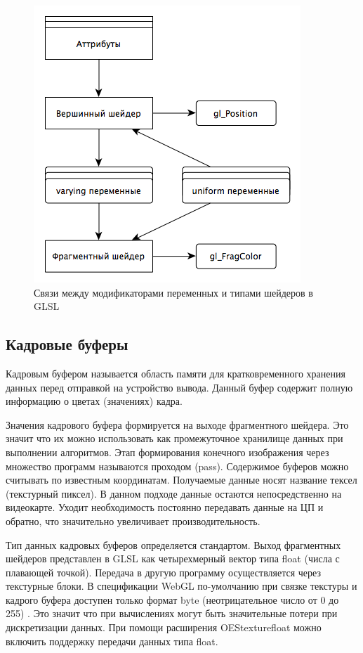 \begin{figure}
\begin{center}
  \includegraphics[scale=1]{Figures/glsl_vars}
\end{center}
\caption{Связи между модификаторами переменных и типами шейдеров в GLSL}
\label{fig:glsl_vars}
\end{figure}


\subsection{Кадровые буферы}

Кадровым буфером называется область памяти для кратковременного хранения данных перед отправкой
на устройство вывода. Данный буфер содержит полную информацию о цветах (значениях) кадра.

Значения кадрового буфера формируется на выходе фрагментного шейдера. Это значит что их можно 
использовать как промежуточное хранилище данных при выполнении алгоритмов. Этап формирования 
конечного изображения через множество программ называются проходом (pass). Содержимое буферов 
можно считывать по известным координатам. Получаемые данные носят название тексел (текстурный 
пиксел). В данном подходе данные остаются непосредственно на видеокарте. Уходит необходимость
постоянно передавать данные на ЦП и обратно, что значительно увеличивает производительность.

Тип данных кадровых буферов определяется стандартом. Выход фрагментных шейдеров представлен в 
GLSL как четырехмерный вектор типа float (числа с плавающей точкой). Передача в другую программу
осуществляется через текстурные блоки. В спецификации WebGL по-умолчанию при связке текстуры
и кадрого буфера доступен только формат byte (неотрицательное число от 0 до 255) \cite{khr11}. 
Это значит что при вычислениях могут быть значительные потери при дискретизации данных. При помощи
расширения OES\textunderscore{}texture\textunderscore{}float можно включить поддержку передачи 
данных типа float.
